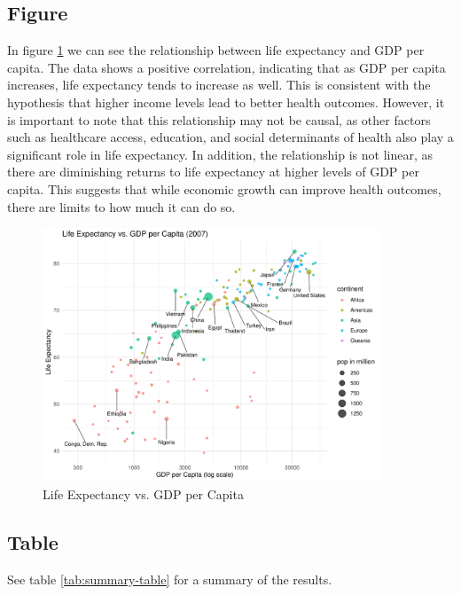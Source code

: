 \subsection{Figure}

In figure \ref{fig:life_expectancy} we can see the relationship between life expectancy and GDP per capita. The data shows a positive correlation, indicating that as GDP per capita increases, life expectancy tends to increase as well. This is consistent with the hypothesis that higher income levels lead to better health outcomes.
However, it is important to note that this relationship may not be causal, as other factors such as healthcare access, education, and social determinants of health also play a significant role in life expectancy.
In addition, the relationship is not linear, as there are diminishing returns to life expectancy at higher levels of GDP per capita. This suggests that while economic growth can improve health outcomes, there are limits to how much it can do so.

\begin{figure}[htbp]
\centering
\includegraphics[width=0.9\textwidth]{../../output/figures/fig_life_expectancy.pdf}
\caption{Life Expectancy vs. GDP per Capita}
\label{fig:life_expectancy}
\end{figure}


\textcolor{gray}{\lipsum[6-8]}

\subsection{Table}

See table \ref{tab:summary-table} for a summary of the results.



\textcolor{gray}{\lipsum[9-10]}